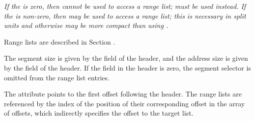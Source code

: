 \textit{\bb
If the \HFNoffsetentrycount{} is zero, then \DWFORMrnglistx{} cannot 
be used to access a range list; \DWFORMsecoffset{} must be used 
instead. If the \HFNoffsetentrycount{} is non-zero, then \DWFORMrnglistx{} 
may be used to access a range list; this is necessary in split units and
otherwise may be more compact than using \DWFORMsecoffset.
\eb
}

Range lists are
described in Section .

The segment size is given by the
\HFNsegmentselectorsize{} field of the header, and the address size is
given by the  field of the header. If the
\HFNsegmentselectorsize{} field in the header is zero, the segment
selector is omitted from the range list entries.

The \DWATrnglistsbase{} attribute points to the first offset 
following the header. The range lists are referenced
by the index of the position of their corresponding offset in the
array of offsets, which indirectly specifies the offset to the
target list.
 
